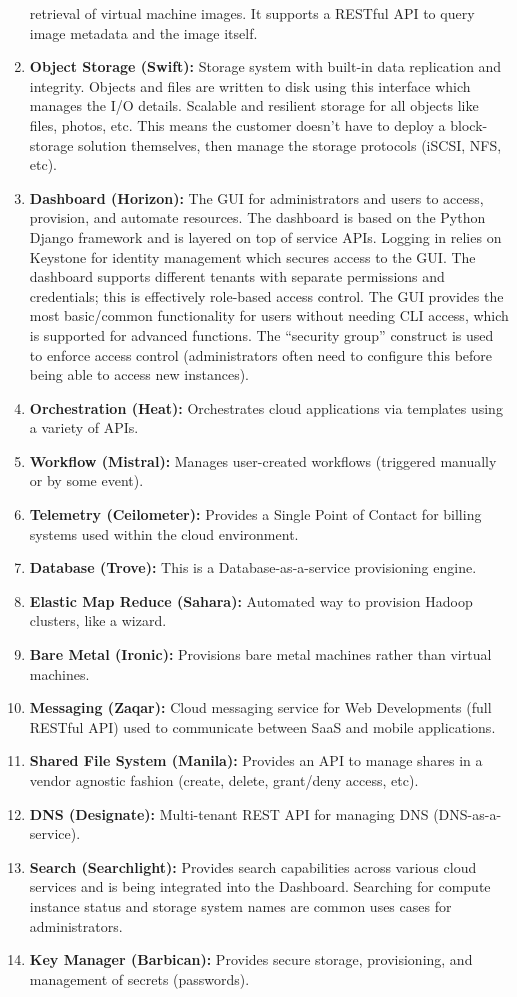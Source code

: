 \begin{enumerate}
  retrieval of virtual machine images. It supports a RESTful API to query
  image metadata and the image itself.
  \item	\textbf{Object Storage (Swift):} Storage system with built-in data
  replication and integrity. Objects and files are written to disk using this
  interface which manages the I/O details. Scalable and resilient storage for
  all objects like files, photos, etc. This means the customer doesn’t have to
  deploy a block-storage solution themselves, then manage the storage
  protocols (iSCSI, NFS, etc).
  \item	\textbf{Dashboard (Horizon):} The GUI for administrators and users to
  access, provision, and automate resources. The dashboard is based on the
  Python Django framework and is layered on top of service APIs. Logging in
  relies on Keystone for identity management which secures access to the GUI.
  The dashboard supports different tenants with separate permissions and
  credentials; this is effectively role-based access control. The GUI provides
  the most basic/common functionality for users without needing CLI access,
  which is supported for advanced functions. The ``security group'' construct
  is used to enforce access control (administrators often need to configure
  this before being able to access new instances).
  \item	\textbf{Orchestration (Heat):} Orchestrates cloud applications via
  templates using a variety of APIs.
  \item	\textbf{Workflow (Mistral):} Manages user-created workflows (triggered
  manually or by some event).
  \item	\textbf{Telemetry (Ceilometer):} Provides a Single Point of Contact
  for billing systems used within the cloud environment.
  \item	\textbf{Database (Trove):} This is a Database-as-a-service
  provisioning engine.
  \item	\textbf{Elastic Map Reduce (Sahara):} Automated way to provision
  Hadoop clusters, like a wizard.
  \item	\textbf{Bare Metal (Ironic):} Provisions bare metal machines rather
  than virtual machines.
  \item	\textbf{Messaging (Zaqar):} Cloud messaging service for Web
  Developments (full RESTful API) used to communicate between SaaS and mobile applications.
  \item	\textbf{Shared File System (Manila):} Provides an API to manage shares
  in a vendor agnostic fashion (create, delete, grant/deny access, etc).
  \item	\textbf{DNS (Designate):} Multi-tenant REST API for managing DNS
  (DNS-as-a-service).
  \item	\textbf{Search (Searchlight):} Provides search capabilities across
  various cloud services and is being integrated into the Dashboard. Searching
  for compute instance status and storage system names are common uses cases
  for administrators.
  \item	\textbf{Key Manager (Barbican):} Provides secure storage,
  provisioning, and management of secrets (passwords).
\end{enumerate}

